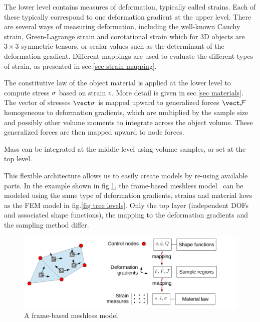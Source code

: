 The lower level contains measures of deformation, typically called strains.
Each of these typically correspond to one deformation gradient at the upper level.
There are several ways of measuring deformation, including the well-known Cauchy strain, Green-Lagrange strain and corotational strain which for 3D objects are $3 \times 3$ symmetric tensors, or scalar values such as the determinant of the deformation gradient.
Different mappings are used to evaluate the different types of strain, as presented in sec.\ref{sec strain mapping}.

The constitutive law of the object material is applied at the lower level to compute stress $\sigma$ based on strain $\epsilon$. 
More detail is given in sec.\ref{sec materials}.
The vector of stresses $\vect \stress$ is mapped upward to generalized forces $\vect \fdefograd$ homogeneous to deformation gradients, which are multiplied by the sample size and possibly other volume moments to integrate across the object volume.
These generalized forces are then mapped upward to node forces.

Mass can be integrated at the middle level using volume samples, or set at the top level.

This flexible architecture allows us to easily create models by re-using available parts. In the example shown in fig.\ref{fig tree levels frame}, the frame-based meshless model~\cite{gilles:frame:TOG11,faure:framesteak:11} can be modeled using the same type of deformation gradients, strains and material laws as the FEM model in fig.\ref{fig tree levels}.
Only the top layer (independent DOFs and associated shape functions), the mapping to the deformation gradients and the sampling method differ.
\begin{figure}
 \centering
 \includegraphics[page=2,height=0.3\linewidth]{threeLevels.pdf}
 \caption{A frame-based meshless model}\label{fig tree levels frame}
\end{figure}









